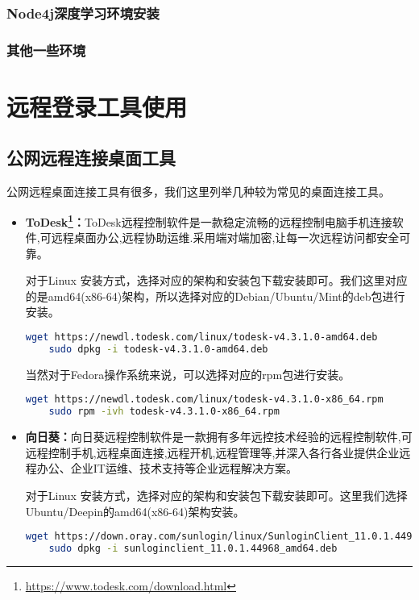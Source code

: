 \documentclass[lang=cn,a4paper,newtx]{elegantpaper}
\begin{document}
\subsubsection{Node4j深度学习环境安装}
\subsubsection{其他一些环境}
\section{远程登录工具使用}
\subsection{公网远程连接桌面工具}
公网远程桌面连接工具有很多，我们这里列举几种较为常见的桌面连接工具。
\begin{itemize}
  \item \textbf{ToDesk\footnote{\url{https://www.todesk.com/download.html}}：}ToDesk远程控制软件是一款稳定流畅的远程控制电脑手机连接软件,可远程桌面办公,远程协助运维.采用端对端加密,让每一次远程访问都安全可靠。
  
  对于Linux 安装方式，选择对应的架构和安装包下载安装即可。我们这里对应的是amd64(x86-64)架构，所以选择对应的Debian/Ubuntu/Mint的deb包进行安装。
  \begin{lstlisting}[language=bash]
    wget https://newdl.todesk.com/linux/todesk-v4.3.1.0-amd64.deb
    sudo dpkg -i todesk-v4.3.1.0-amd64.deb
  \end{lstlisting}

  当然对于Fedora操作系统来说，可以选择对应的rpm包进行安装。
  \begin{lstlisting}[language=bash]
    wget https://newdl.todesk.com/linux/todesk-v4.3.1.0-x86_64.rpm
    sudo rpm -ivh todesk-v4.3.1.0-x86_64.rpm
  \end{lstlisting}
  \item \textbf{向日葵：}向日葵远程控制软件是一款拥有多年远控技术经验的远程控制软件,可远程控制手机,远程桌面连接,远程开机,远程管理等,并深入各行各业提供企业远程办公、企业IT运维、技术支持等企业远程解决方案。
  
  对于Linux 安装方式，选择对应的架构和安装包下载安装即可。这里我们选择Ubuntu/Deepin的amd64(x86-64)架构安装。
  \begin{lstlisting}[language=bash]
    wget https://down.oray.com/sunlogin/linux/SunloginClient_11.0.1.44968_amd64.deb
    sudo dpkg -i sunloginclient_11.0.1.44968_amd64.deb
  \end{lstlisting}
  

\end{itemize}
\end{document}
